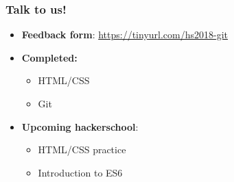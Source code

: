 \documentclass[12pt]{beamer}
\begin{document}
\begin{frame}
\frametitle{Talk to us!}
\begin{itemize}
	\item \textbf{Feedback form}: \url{https://tinyurl.com/hs2018-git}
	\item \textbf{Completed:}
	\begin{itemize}
		\item HTML/CSS
		\item Git
	\end{itemize}
	\item \textbf{Upcoming hackerschool}:
	\begin{itemize}
		\item HTML/CSS practice
		\item Introduction to ES6
	\end{itemize}
\end{itemize}
\end{frame}
\end{document}
